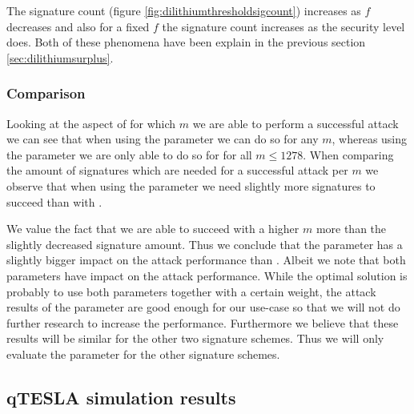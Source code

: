 \documentclass[a4paper,titlepage]{article}
\begin{document}
The signature count (figure \ref{fig:dilithiumthresholdsigcount}) increases as $f$ decreases and also for a fixed $f$ the signature count increases as the security level does.
Both of these phenomena have been explain in the previous section \ref{sec:dilithiumsurplus}.

\subsubsection{Comparison}
\label{sec:dilithiumcompare}
Looking at the aspect of for which $m$ we are able to perform a successful attack we can see that when using the  parameter we can do so for any $m$, whereas using the  parameter we are only able to do so for for all $m \leq 1278$. 
When comparing the amount of signatures which are needed for a successful attack per $m$ we  observe that when using the  parameter we need slightly more signatures to succeed than with .

We value the fact that we are able to succeed with a higher $m$ more than the slightly decreased signature amount. Thus we conclude that the parameter  has a slightly bigger impact on the attack performance than .
Albeit we note that both parameters have impact on the attack performance. While the optimal solution is probably to use both parameters together with a certain weight, the attack results of the  parameter are good enough for our use-case so that we will not do further research to increase the performance.
Furthermore we believe that these results will be similar for the other two signature schemes. Thus we will only evaluate the  parameter for the other signature schemes.

\subsection{qTESLA simulation results}
\label{fig:resqtesla}
\end{document}
